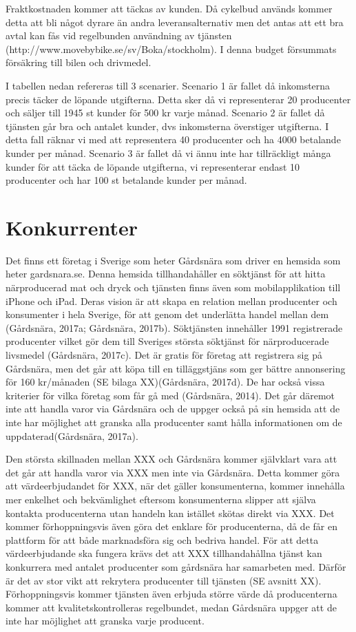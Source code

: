 \documentclass[10pt,a4paper,oneside]{article}
\begin{document}
Fraktkostnaden kommer att täckas av kunden. Då cykelbud används kommer detta att bli något dyrare än andra leveransalternativ men det antas att ett bra avtal kan fås vid regelbunden användning av tjänsten (http://www.movebybike.se/sv/Boka/stockholm). I denna budget försummats försäkring till bilen och drivmedel. 

I tabellen nedan refereras till 3 scenarier. Scenario 1 är fallet då inkomsterna precis täcker de löpande utgifterna. Detta sker då vi representerar 20 producenter och säljer till 1945 st kunder för 500 kr varje månad. Scenario 2 är fallet då tjänsten går bra och antalet kunder, dvs inkomsterna överstiger utgifterna. I detta fall räknar vi med att representera 40 producenter och ha 4000 betalande kunder per månad. Scenario 3 är fallet då vi ännu inte har tillräckligt många kunder för att täcka de löpande utgifterna, vi representerar endast 10 producenter och har 100 st betalande kunder per månad. 

\newpage

\section{Konkurrenter}
Det finns ett företag i Sverige som heter Gårdsnära som driver en hemsida som heter gardsnara.se. Denna hemsida tillhandahåller en söktjänst för att hitta närproducerad mat och dryck och tjänsten finns även som mobilapplikation till iPhone och iPad. Deras vision är att skapa en relation mellan producenter och konsumenter i hela Sverige, för att genom det underlätta handel mellan dem (Gårdsnära, 2017a; Gårdsnära, 2017b). Söktjänsten innehåller 1991 registrerade producenter vilket gör dem till Sveriges största söktjänst för närproducerade livsmedel (Gårdsnära, 2017c). Det är gratis för företag att registrera sig på Gårdsnära, men det går att köpa till en tilläggstjäns som ger bättre annonsering för 160 kr/månaden (SE bilaga XX)(Gårdsnära, 2017d). De har också vissa kriterier för vilka företag som får gå med (Gårdsnära, 2014). Det går däremot inte att handla varor via Gårdsnära och de uppger också på sin hemsida att de inte har möjlighet att granska alla producenter samt hålla informationen om de uppdaterad(Gårdsnära, 2017a).

Den största skillnaden mellan XXX och Gårdsnära kommer självklart vara att det går att handla varor via XXX men inte via Gårdsnära. Detta kommer göra att värdeerbjudandet för XXX, när det gäller konsumenterna, kommer innehålla mer enkelhet och bekvämlighet eftersom konsumenterna slipper att själva kontakta producenterna utan handeln kan istället skötas direkt via XXX. Det kommer förhoppningsvis även göra det enklare för producenterna, då de får en plattform för att både marknadsföra sig och bedriva handel. För att detta värdeerbjudande ska fungera krävs det att XXX tillhandahållna tjänst kan konkurrera med antalet producenter som gårdsnära har samarbeten med. Därför är det av stor vikt att rekrytera producenter till tjänsten (SE avsnitt XX). Förhoppningsvis kommer tjänsten även erbjuda större värde då producenterna kommer att kvalitetskontrolleras regelbundet, medan Gårdsnära uppger att de inte har möjlighet att granska varje producent.
\end{document}
